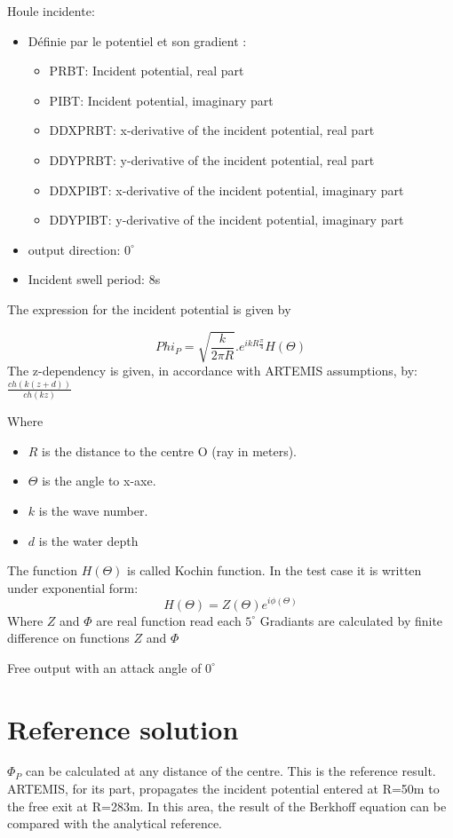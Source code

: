 Houle incidente:
\begin{itemize}
\item Définie par le potentiel et son gradient :
\begin{itemize}
\item PRBT: Incident potential, real part
\item PIBT: Incident potential, imaginary part 
\item DDXPRBT: x-derivative of the incident potential, real part
\item DDYPRBT: y-derivative of the incident potential, real part
\item DDXPIBT: x-derivative of the incident potential, imaginary part
\item DDYPIBT: y-derivative of the incident potential, imaginary part
\end{itemize}
\item output direction: $0^\circ$
\item Incident swell period: 8s
\end{itemize}

The expression for the incident potential is given by \cite{Babarit2011}

\begin{equation}
  Phi_P = \sqrt{\frac{k}{2\pi R}}.e^{ikR\frac{\pi}{4}}H(\Theta)
  \end{equation}
The z-dependency is given, in accordance with ARTEMIS assumptions, by:
$\frac{ch(k(z+d))}{ch(kz)}$

Where
\begin{itemize}
\item $R$ is the distance to the centre O (ray in meters).
\item $\Theta$ is the angle to x-axe.
\item $k$ is the wave number.
\item $d$ is the water depth
\end{itemize}
The function $H(\Theta)$ is called Kochin function. In the test case it is written under exponential form:
$$
H(\Theta) = Z(\Theta) e^{i\phi(\Theta)}
$$
Where $Z$ and $\Phi$ are real function read each $5^\circ$
Gradiants are calculated by finite difference on functions $Z$ and $\Phi$

Free output with an attack angle of $0^\circ$

\section{Reference solution}
$\Phi_P$ can be calculated at any distance of the centre. This is the reference
result.  ARTEMIS, for its part, propagates the incident potential entered at
R=50m to the free exit at R=283m. In this area, the result of the Berkhoff
equation can be compared with the analytical reference.


